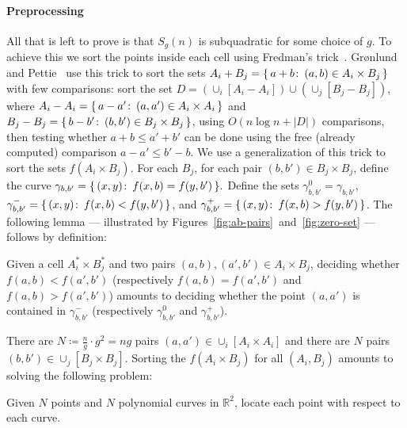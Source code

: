 \paragraph{Preprocessing} All that is left to prove is that $S_g(n)$ is
subquadratic for some choice of $g$. To achieve this we sort the points
inside each cell using Fredman's trick~\cite{Fr76}. Gr\o nlund and
Pettie~\cite{GP18} use this trick to sort the sets
$A_i + B_j = \{\,a + b \colon\, (a,b) \in A_i \times B_j \,\}$
with few comparisons: sort the set
$D = (\cup_i [A_i - A_i]) \cup (\cup_j [B_j - B_j])$,
where
$A_i - A_i = \{\,a - a' \colon\, (a,a')\in A_i \times A_i \,\}$
and
$B_j - B_j = \{\,b - b' \colon\, (b,b')\in B_j \times B_j \,\}$,
using $O(n\log n + |D|)$ comparisons, then testing whether
$a + b \le a' + b'$
can be done using the free (already computed) comparison
$a - a' \le b' - b$.
We use a generalization of this trick to sort the sets $f(A_i\times B_j)$.
For each $B_j$, for each pair \((b,b') \in B_j \times B_j\),
define the curve
$
	\gamma_{b,b'} = \{\,(x,y) \colon\, f(x,b) = f(y,b')\,\}.
$
Define the sets
$\gamma^0_{b,b'} = \gamma_{b,b'}$,
$\gamma^-_{b,b'} = \{\,(x,y) \colon\, f(x,b) < f(y,b')\,\}$, and
$\gamma^+_{b,b'} = \{\,(x,y) \colon\, f(x,b) > f(y,b')\,\}$.
%
The following lemma --- illustrated by
Figures~\ref{fig:ab-pairs}~and~\ref{fig:zero-set} --- follows by definition:
\begin{lemma}\label{lem:fredman}
Given a cell $A_i^* \times B_j^*$ and two pairs \((a,b), (a',b') \in A_i \times B_j\),
deciding whether \(f(a,b) < f(a',b')\) (respectively
$f(a,b) = f(a',b')$
and
$f(a,b) > f(a',b')$)
amounts to deciding whether the point
$(a,a')$ is contained in \(\gamma^-_{b,b'}\) (respectively
\(\gamma^0_{b,b'}\) and
\(\gamma^+_{b,b'}\)).
\end{lemma}

There are $N \coloneqq \frac ng \cdot g^2 = ng$ pairs $(a,a') \in \cup_i [A_i \times
A_i]$ and there are $N$ pairs $(b,b') \in \cup_j [B_j \times B_j]$.  Sorting
the $f(A_i\times B_j)$ for all $(A_i, B_j)$ amounts to solving the
following problem:
\begin{problem}
    Given $N$ points and $N$ polynomial curves in $\mathbb{R}^2$, locate
    each point with respect to each curve.
\end{problem}

